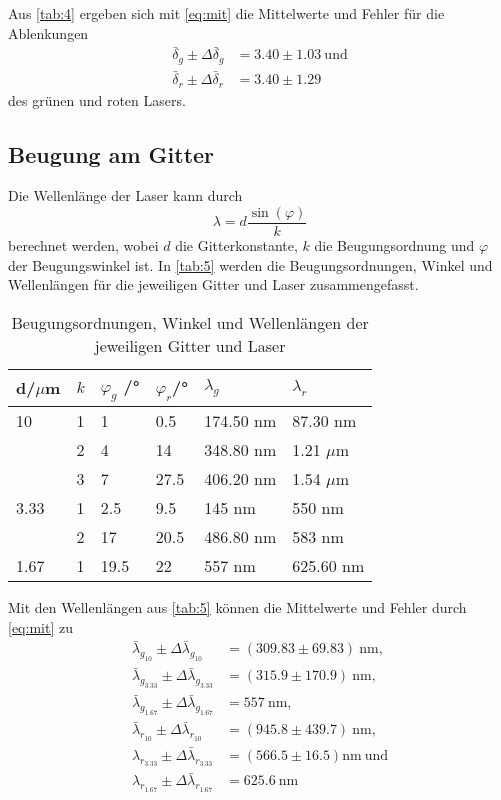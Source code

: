 Aus \autoref{tab:4} ergeben sich mit \eqref{eq:mit} die Mittelwerte und Fehler für die Ablenkungen
\begin{align*}
  \bar \delta_g \pm \Delta \bar \delta_g&=3.40 \pm 1.03\ \textrm{und}\\
  \bar \delta_r \pm \Delta \bar \delta_r&=3.40 \pm 1.29
\end{align*}
des grünen und roten Lasers.

\subsection{Beugung am Gitter}
Die Wellenlänge der Laser kann durch 
\begin{equation*}
  \lambda=d\frac{\sin(\varphi)}{k}
\end{equation*}
berechnet werden, wobei $d$ die Gitterkonstante, $k$ die Beugungsordnung und $\varphi$ der Beugungswinkel ist. In \autoref{tab:5} werden die Beugungsordnungen, Winkel und Wellenlängen für die jeweiligen Gitter und Laser zusammengefasst.
\begin{table}[H]
  \centering
  \caption{Beugungsordnungen, Winkel und Wellenlängen der jeweiligen Gitter und Laser}
  \begin{tabular}{l|l|l|l|l|l}
  d/$\mu$m & $k$ & $\varphi_g$ /°& $\varphi_r$/° & $\lambda_g$ & $\lambda_r$\\\hline
  10 & 1 & 1 & 0.5 & 174.50 nm & 87.30 nm \\
     & 2 & 4 & 14 & 348.80 nm & 1.21 $\mu$m  \\
     & 3 & 7 & 27.5 & 406.20 nm & 1.54 $\mu$m \\\hline
  3.33 & 1 & 2.5 & 9.5 & 145 nm & 550 nm\\
     & 2 &17 & 20.5 & 486.80 nm & 583 nm \\\hline
  1.67 & 1 & 19.5 & 22 & 557 nm & 625.60 nm\\\hline
  \end{tabular}
  \label{tab:5}
\end{table}
Mit den Wellenlängen aus \autoref{tab:5} können die Mittelwerte und Fehler durch \eqref{eq:mit} zu
\begin{align*}
  \bar \lambda_{g_10} \pm \Delta \bar \lambda_{g_10}&=(309.83 \pm 69.83)\ \textrm{nm},\\
  \bar \lambda_{g_3.33} \pm \Delta \bar \lambda_{g_3.33}&=(315.9 \pm 170.9)\ \textrm{nm},\\
  \bar \lambda_{g_1.67} \pm \Delta \bar \lambda_{g_1.67}&=557\ \textrm{nm},\\
  \bar \lambda_{r_10} \pm \Delta \bar \lambda_{r_10}&=(945.8 \pm 439.7)\ \textrm{nm},\\
  \lambda_{r_3.33} \pm \Delta \bar \lambda_{r_3.33}&=(566.5 \pm 16.5) \textrm{nm}\ \textrm{und}\\
  \lambda_{r_1.67} \pm \Delta \bar \lambda_{r_1.67}&=625.6\ \textrm{nm}
\end{align*}
